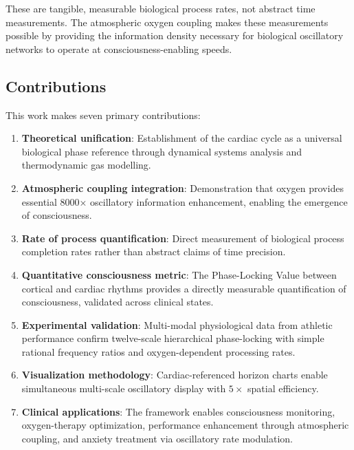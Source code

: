 \documentclass[12pt]{article}
\theoremstyle{remark}
\begin{document}
These are tangible, measurable biological process rates, not abstract time measurements. The atmospheric oxygen coupling makes these measurements possible by providing the information density necessary for biological oscillatory networks to operate at consciousness-enabling speeds.

\subsection{Contributions}

This work makes seven primary contributions:

\begin{enumerate}
\item \textbf{Theoretical unification}: Establishment of the cardiac cycle as a universal biological phase reference through dynamical systems analysis and thermodynamic gas modelling.

\item \textbf{Atmospheric coupling integration}: Demonstration that oxygen provides essential 8000× oscillatory information enhancement, enabling the emergence of consciousness.

\item \textbf{Rate of process quantification}: Direct measurement of biological process completion rates rather than abstract claims of time precision.

\item \textbf{Quantitative consciousness metric}: The Phase-Locking Value between cortical and cardiac rhythms provides a directly measurable quantification of consciousness, validated across clinical states.

\item \textbf{Experimental validation}: Multi-modal physiological data from athletic performance confirm twelve-scale hierarchical phase-locking with simple rational frequency ratios and oxygen-dependent processing rates.

\item \textbf{Visualization methodology}: Cardiac-referenced horizon charts enable simultaneous multi-scale oscillatory display with $5\times$ spatial efficiency.

\item \textbf{Clinical applications}: The framework enables consciousness monitoring, oxygen-therapy optimization, performance enhancement through atmospheric coupling, and anxiety treatment via oscillatory rate modulation.
\end{enumerate}
\end{document}
